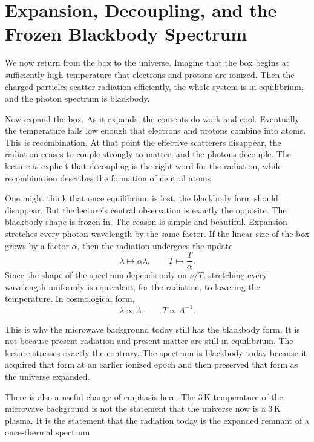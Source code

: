 \section{Expansion, Decoupling, and the Frozen Blackbody Spectrum}

We now return from the box to the universe. Imagine that the box begins at sufficiently high temperature that electrons and protons are ionized. Then the charged particles scatter radiation efficiently, the whole system is in equilibrium, and the photon spectrum is blackbody.

Now expand the box. As it expands, the contents do work and cool. Eventually the temperature falls low enough that electrons and protons combine into atoms. This is recombination. At that point the effective scatterers disappear, the radiation ceases to couple strongly to matter, and the photons decouple. The lecture is explicit that decoupling is the right word for the radiation, while recombination describes the formation of neutral atoms.

One might think that once equilibrium is lost, the blackbody form should disappear. But the lecture's central observation is exactly the opposite. The blackbody shape is frozen in. The reason is simple and beautiful. Expansion stretches every photon wavelength by the same factor. If the linear size of the box grows by a factor \(\alpha\), then the radiation undergoes the update
\begin{equation}
\lambda \mapsto \alpha \lambda,
\qquad
T \mapsto \frac{T}{\alpha}.
\end{equation}
Since the shape of the spectrum depends only on \(\nu/T\), stretching every wavelength uniformly is equivalent, for the radiation, to lowering the temperature. In cosmological form,
\begin{equation}
\lambda \propto A,
\qquad
T \propto A^{-1}.
\end{equation}

This is why the microwave background today still has the blackbody form. It is not because present radiation and present matter are still in equilibrium. The lecture stresses exactly the contrary. The spectrum is blackbody today because it acquired that form at an earlier ionized epoch and then preserved that form as the universe expanded.

There is also a useful change of emphasis here. The \(3\,\mathrm{K}\) temperature of the microwave background is not the statement that the universe now is a \(3\,\mathrm{K}\) plasma. It is the statement that the radiation today is the expanded remnant of a once-thermal spectrum.

